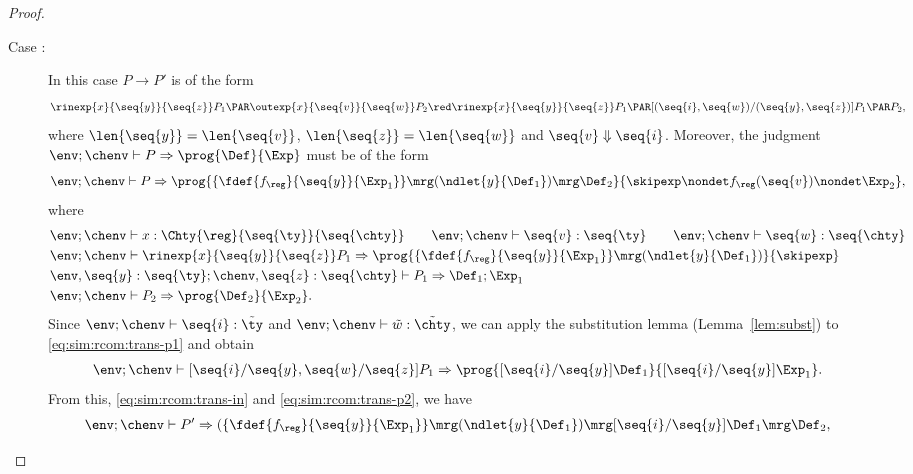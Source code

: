 \begin{proof}
\begin{description}
    \item[Case :]
    In this case  $P \to P'$ is of the form
    \begin{align*}
      \rinexp{x}{\seq{y}}{\seq{z}}P_1 \PAR \outexp{x}{\seq{v}}{\seq{w}}P_2 \red \rinexp{x}{\seq{y}}{\seq{z}}P_1 \PAR [(\seq{i},\seq{w})/(\seq{y},\seq{z})]P_1 \PAR P_2,
    \end{align*}
    where
    $\len{\seq{y}} = \len{\seq{v}}$,
    $\len{\seq{z}} = \len{\seq{w}}$
    and $\seq{v} \Downarrow \seq{i}$.
    Moreover, the judgment $\env; \chenv \vdash P \Rightarrow
    \prog{\Def}{\Exp}$ must be of the form
    \begin{align*}
      \env; \chenv \vdash P \Rightarrow
      \prog{\{ \fdef{f_\reg}{\seq{y}}{\Exp_1} \} \mrg (\ndlet{y}{\Def_1}) \mrg \Def_2}
      {\skipexp \nondet f_\reg (\seq{v}) \nondet \Exp_2},
    \end{align*}
    where
    \begin{align}
      &\env; \chenv \vdash x : \Chty{\reg}{\seq{\ty}}{\seq{\chty}}
      \qquad \env; \chenv \vdash \seq{v} : \seq{\ty}
      \qquad \env; \chenv \vdash \seq{w} : \seq{\chty} \nonumber \\
      &\env; \chenv \vdash \rinexp{x}{\seq{y}}{\seq{z}}P_1 \Rightarrow
      \prog{\{ \fdef{f_\reg}{\seq{y}}{\Exp_1} \} \mrg (\ndlet{y}{\Def_1})}{
        \skipexp} \label{eq:sim:rcom:trans-in} \\
      &\env, \seq{y} : \seq{\ty}; \chenv, \seq{z} : \seq{\chty} \vdash P_1 \Rightarrow \Def_1; \Exp_1 \label{eq:sim:rcom:trans-p1}\\
      &\env; \chenv \vdash P_2 \Rightarrow \prog{\Def_2}{\Exp_2}. \label{eq:sim:rcom:trans-p2}
    \end{align}
    Since
    $\env; \chenv \vdash \seq{i} : \tilde{\ty}$ and
    $\env; \chenv \vdash \tilde{w} : \tilde{\chty}$, we can apply the substitution lemma (Lemma~\ref{lem:subst}) to \eqref{eq:sim:rcom:trans-p1} and obtain
    \begin{align*}
      \env; \chenv \vdash [\seq{i} / \seq{y}, \seq{w}/\seq{z}]P_1 \Rightarrow
          \prog{[\seq{i}/\seq{y}]\Def_1}{[\seq{i}/\seq{y}]\Exp_1}.
    \end{align*}
    From this, \eqref{eq:sim:rcom:trans-in} and \eqref{eq:sim:rcom:trans-p2}, we have
    \begin{align*}
      \env; \chenv \vdash P' \Rightarrow
      \begin{aligned}
        &(\{ \fdef{f_\reg}{\seq{y}}{\Exp_1} \} \mrg (\ndlet{y}{\Def_1}) \mrg  [\seq{i}/\seq{y}]\Def_1 \mrg \Def_2, \\

\end{aligned}
\end{align*}
\end{description}
\end{proof}
